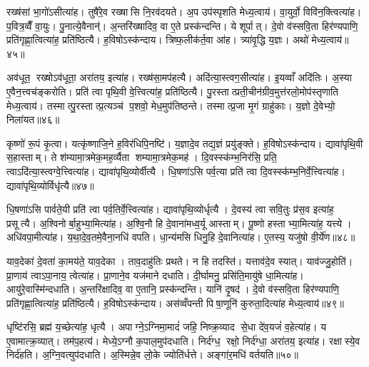 रख्ष॑सां भा॒गो॑ऽसीत्या॑ह। तुषै॑रे॒व रख्षासि नि॒रव॑दयते। अ॒प उप॑स्पृशति मेध्य॒त्वाय॑। वा॒युर्वो॒ विवि॑न॒क्त्वित्या॑ह। प॒वित्र॒व्वैँ वा॒युः। पु॒नात्ये॒वैनान्॑। अ॒न्तरि॑ख्षादिव॒ वा ए॒ते प्रस्क॑न्दन्ति। ये शूर्पात्। दे॒वो व॑स्सवि॒ता हिर॑ण्यपाणि॒ प्रति॑गृह्णा॒त्वित्या॑ह॒ प्रति॑ष्ठित्यै। ह॒विषोऽस्क॑न्दाय। त्रिष्फ॒लीक॑र्त॒वा आ॑ह। त्र्या॑वृ॒द्धि य॒ज्ञः। अथो॑ मेध्य॒त्वाय॑॥४५॥\anuvakamend[द्वाभ्या॒मुत्पु॑नाति र॒श्मयो॑ नय॒न्त्यग्रे॑ य॒ज्ञप॑तिय्यँ॒ज्ञोऽदि॑ति॒रस्क॑न्दाय गृह्णा॒मीत्या॑ह व॒देत्या॑ह॒ विजि॑त्या॒ अप॑हत्या॒ अस्क॑न्दाय॒ त्रीणि॑ च]

अव॑धूत॒ रख्षोऽव॑धूता॒ अरा॑तय॒ इत्या॑ह। रख्ष॑सा॒मप॑हत्यै। अदि॑त्या॒स्त्वग॒सीत्या॑ह। इ॒यव्वाँ अदि॑तिः। अ॒स्या ए॒वैन॒त्त्वच॑ङ्करोति। प्रति॑ त्वा पृथि॒वी वे॒त्त्वित्या॑ह॒ प्रति॑ष्ठित्यै। पु॒रस्तात्प्रती॒चीन॑ग्रीव॒मुत्त॑रलो॒मोप॑स्तृणाति मेध्य॒त्वाय॑। तस्मात्पु॒रस्तात्प्र॒त्यञ्च॑ प॒शवो॒ मेध॒मुप॑तिष्ठन्ते। तस्मात्प्र॒जा मृ॒गं ग्राहु॑काः। य॒ज्ञो दे॒वेभ्यो॒ निला॑यत॥४६॥

कृष्णो॑ रू॒पं कृ॒त्वा। यत्कृ॑ष्णाजि॒ने ह॒विर॑धिपि॒नष्टि॑। य॒ज्ञादे॒व तद्य॒ज्ञं प्रयु॑ङ्क्ते। ह॒विषोऽस्क॑न्दाय। द्यावा॑पृथि॒वी स॒हास्ताम्। ते श॑म्यामा॒त्रमेक॒मह॒र्व्यैता शम्यामा॒त्रमेक॒मह॑। दि॒वस्स्क॑म्भ॒निर॑सि॒ प्रति॒ त्वाऽदि॑त्या॒स्त्वग्वे॒त्त्वित्या॑ह। द्यावा॑पृथि॒व्योर्वीत्यै। धि॒षणा॑ऽसि पर्व॒त्या प्रति॑ त्वा दि॒वस्स्क॑म्भ॒निर्वे॒त्त्वित्या॑ह। द्यावा॑पृथि॒व्योर्विधृ॑त्यै॥४७॥

धि॒षणा॑ऽसि पार्वते॒यी प्रति॑ त्वा पर्व॒तिर्वे॒त्त्वित्या॑ह। द्यावा॑पृथि॒व्योर्धृत्यै। दे॒वस्य॑ त्वा सवि॒तुः प्र॑स॒व इत्या॑ह॒ प्रसूत्यै। अ॒श्विनोर्बा॒हुभ्या॒मित्या॑ह। अ॒श्वि॒नौ हि दे॒वाना॑मध्व॒र्यू आस्ताम्। पू॒ष्णो हस्ताभ्या॒मित्या॑ह॒ यत्त्ये। अधि॑वपा॒मीत्या॑ह। य॒था॒दे॒व॒तमे॒वैना॒नधि॑ वपति। धा॒न्य॑मसि धिनु॒हि दे॒वानित्या॑ह। ए॒तस्य॒ यजु॑षो वी॒र्ये॑ण॥४८॥

याव॒देका॑ दे॒वता॑ का॒मय॑ते॒ याव॒देका। ताव॒दाहु॑तिः प्रथते। न हि तदस्ति॑। यत्ताव॑दे॒व स्यात्। याव॑ज्जु॒होति॑। प्रा॒णाय॑ त्वाऽपा॒नाय॒ त्वेत्या॑ह। प्रा॒णाने॒व यज॑माने दधाति। दी॒र्घामनु॒ प्रसि॑ति॒मायु॑षे धा॒मित्या॑ह। आयु॑रे॒वास्मि॑न्दधाति। अ॒न्तरि॑क्षादिव॒ वा ए॒तानि॒ प्रस्क॑न्दन्ति। यानि॑ दृ॒षद॑। दे॒वो व॑स्सवि॒ता हिर॑ण्यपाणि॒ प्रति॑गृह्णा॒त्वित्या॑ह॒ प्रति॑ष्ठित्यै। ह॒विषोऽस्क॑न्दाय। अस॑व्वँपन्ती पिषा॒णूनि॑ कुरुता॒दित्या॑ह मेध्य॒त्वाय॑॥४९॥\anuvakamend[निला॑यत॒ विधृ॑त्यै वी॒र्ये॑ण स्कन्दन्ति च॒त्वारि॑ च]

धृष्टि॑रसि॒ ब्रह्म॑ य॒च्छेत्या॑ह॒ धृत्यै। अपाग्ने॒ऽग्निमा॒मादं॑ जहि॒ निष्क्र॒व्याद से॒धा दे॑व॒यजं॑ व॒हेत्या॑ह। य ए॒वामात्क्र॒व्यात्। तम॑प॒हत्य॑। मेध्ये॒ऽग्नौ क॒पाल॒मुप॑दधाति। निर्द॑ग्ध॒ रक्षो॒ निर्द॑ग्धा॒ अरा॑तय॒ इत्या॑ह। रक्षास्ये॒व निर्द॑हति। अ॒ग्नि॒वत्युप॑दधाति। अ॒स्मिन्ने॒व लो॒के ज्योति॑र्धत्ते। अङ्गा॑र॒मधि॑ वर्तयति॥५०॥

